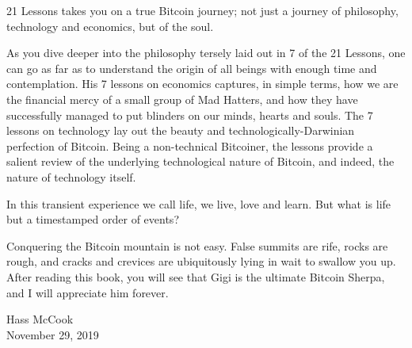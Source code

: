21 Lessons takes you on a true Bitcoin journey; not just a journey of
philosophy, technology and economics, but of the soul.

As you dive deeper into the philosophy tersely laid out in 7 of the 21 Lessons,
one can go as far as to understand the origin of all beings with enough time and
contemplation. His 7 lessons on economics captures, in simple terms, how we are
the financial mercy of a small group of Mad Hatters, and how they have
successfully managed to put blinders on our minds, hearts and souls. The 7
lessons on technology lay out the beauty and technologically-Darwinian
perfection of Bitcoin. Being a non-technical Bitcoiner, the lessons provide a
salient review of the underlying technological nature of Bitcoin, and indeed,
the nature of technology itself.

In this transient experience we call life, we live, love and learn. But what is
life but a timestamped order of events?

Conquering the Bitcoin mountain is not easy. False summits are rife, rocks are
rough, and cracks and crevices are ubiquitously lying in wait to swallow you up.
After reading this book, you will see that Gigi is the ultimate Bitcoin Sherpa,
and I will appreciate him forever.

\begin{flushright}
  Hass McCook \\
  November 29, 2019
\end{flushright}
